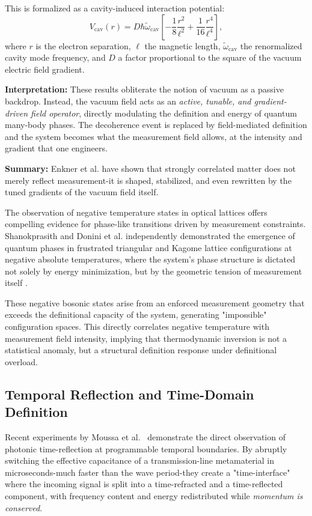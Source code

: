 This is formalized as a cavity-induced interaction potential:
\begin{equation}
V_{\text{cav}}(r) = D \hbar\tilde{\omega}_{\text{cav}} \left[ -\frac{1}{8} \frac{r^2}{\ell^2} + \frac{1}{16} \frac{r^4}{\ell^4} \right],
\end{equation}
where $r$ is the electron separation, $\ell$ the magnetic length, $\tilde{\omega}_{\text{cav}}$ the renormalized cavity mode frequency, and $D$ a factor proportional to the square of the vacuum electric field gradient.

\textbf{Interpretation:}  
These results obliterate the notion of vacuum as a passive backdrop. Instead, the vacuum field acts as an \emph{active, tunable, and gradient-driven field operator}, directly modulating the definition and energy of quantum many-body phases. The decoherence event is replaced by field-mediated definition and the system becomes what the measurement field allows, at the intensity and gradient that one engineers.

\textbf{Summary:}  
Enkner et al. have shown that strongly correlated matter does not merely reflect measurement-it is shaped, stabilized, and even rewritten by the tuned gradients of the vacuum field itself.

The observation of negative temperature states in optical lattices offers compelling evidence for phase-like transitions driven by measurement constraints. Shanokprasith and Donini et al. independently demonstrated the emergence of quantum phases in frustrated triangular and Kagome lattice configurations at negative absolute temperatures, where the system's phase structure is dictated not solely by energy minimization, but by the geometric tension of measurement itself \cite{shanokprasith_2024}. 

These negative bosonic states arise from an enforced measurement geometry that exceeds the definitional capacity of the system, generating "impossible" configuration spaces. This directly correlates negative temperature with measurement field intensity, implying that thermodynamic inversion is not a statistical anomaly, but a structural definition response under definitional overload.\cite{donini_quantum_2024} 

\subsection{Temporal Reflection and Time-Domain Definition}

Recent experiments by Moussa et al.~\cite{moussa_observation_2023} demonstrate the direct observation of photonic time-reflection at programmable temporal boundaries. By abruptly switching the effective capacitance of a transmission-line metamaterial in microseconds-much faster than the wave period-they create a "time-interface" where the incoming signal is split into a time-refracted and a time-reflected component, with frequency content and energy redistributed while \emph{momentum is conserved}.

